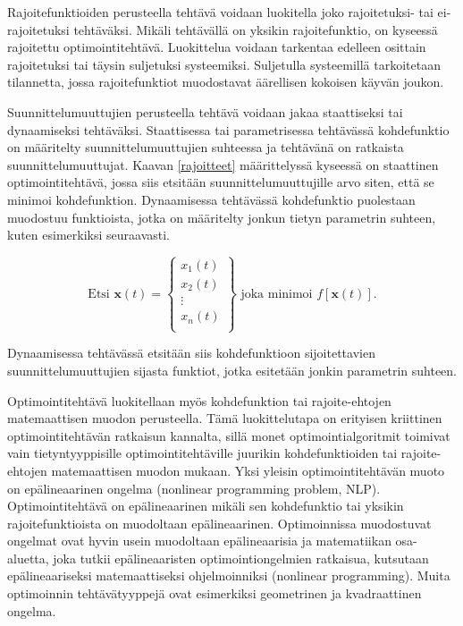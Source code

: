 \documentclass[12pt]{article}
\newenvironment{content}{\pagenumbering{arabic}}{}
\begin{document}
\begin{content}
Rajoitefunktioiden perusteella tehtävä voidaan luokitella joko rajoitetuksi- tai ei-rajoitetuksi tehtäväksi. Mikäli tehtävällä on yksikin rajoitefunktio, on kyseessä rajoitettu optimointitehtävä. Luokittelua voidaan tarkentaa edelleen osittain rajoitetuksi tai täysin suljetuksi systeemiksi. Suljetulla systeemillä tarkoitetaan tilannetta, jossa rajoitefunktiot muodostavat äärellisen kokoisen käyvän joukon. 

Suunnittelumuuttujien perusteella tehtävä voidaan jakaa staattiseksi tai dynaamiseksi tehtäväksi. Staattisessa tai parametrisessa tehtävässä kohdefunktio on määritelty suunnittelumuuttujien suhteessa ja tehtävänä on ratkaista suunnittelumuuttujat. Kaavan \eqref{rajoitteet} määrittelyssä kyseessä on staattinen optimointitehtävä, jossa siis etsitään suunnittelumuuttujille arvo siten, että se minimoi kohdefunktion. Dynaamisessa tehtävässä kohdefunktio puolestaan muodostuu funktioista, jotka on määritelty jonkun tietyn parametrin suhteen, kuten esimerkiksi seuraavasti.

\begin{equation}
\label{dynaaminen}
\text{Etsi } \textbf{x}(t) = 
\begin{Bmatrix} 
x_1(t) \\ 
x_2(t) \\ 
\vdots \\ 
x_n(t) \\ 
\end{Bmatrix}
\text{    joka minimoi } f[\textbf{x}(t)].
\end{equation}

Dynaamisessa tehtävässä etsitään siis kohdefunktioon sijoitettavien suunnittelumuuttujien sijasta funktiot, jotka esitetään jonkin parametrin suhteen. \parencite[15]{rao}

Optimointitehtävä luokitellaan myös kohdefunktion tai rajoite-ehtojen matemaattisen muodon perusteella. Tämä luokittelutapa on erityisen kriittinen optimointitehtävän ratkaisun kannalta, sillä monet optimointialgoritmit toimivat vain tietyntyyppisille optimointitehtäville juurikin kohdefunktioiden tai rajoite-ehtojen matemaattisen muodon mukaan. Yksi yleisin optimointitehtävän muoto on epälineaarinen ongelma (nonlinear programming problem, NLP). Optimointitehtävä on epälineaarinen mikäli sen kohdefunktio tai yksikin rajoitefunktioista on muodoltaan epälineaarinen. Optimoinnissa muodostuvat ongelmat ovat hyvin usein muodoltaan epälineaarisia ja matematiikan osa-aluetta, joka tutkii epälineaaristen optimointiongelmien ratkaisua, kutsutaan epälineaariseksi matemaattiseksi ohjelmoinniksi (nonlinear programming). Muita optimoinnin tehtävätyyppejä ovat esimerkiksi geometrinen ja kvadraattinen ongelma. \parencite[19]{rao} 


\end{content}
\end{document}
